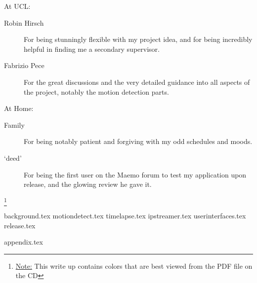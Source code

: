 \documentclass[11pt]{article} %
\begin{document}
	\begin{description}
	\item At UCL:
		\begin{description}
		\item [Robin Hirsch] For being stunningly flexible with my project idea, and for being incredibly helpful in finding me a secondary supervisor.
		\item [Fabrizio Pece] For the great discussions and the very detailed guidance into all aspects of the project, notably the motion detection parts.
		\end{description}
	\item At Home:
		\begin{description}
		\item [Family] For being notably patient and forgiving with my odd schedules and moods.
		\item [‘deed’] For being the first user on the Maemo forum to test my application upon release, and the glowing review he gave it.
		\end{description}		
	\end{description}
\footnote{\underline{Note:} This write up contains colors that are best viewed from the PDF file on the CD}
\pagebreak

{background.tex}
{motiondetect.tex}
{timelapse.tex}
{ipstreamer.tex}
{userinterfaces.tex}
{release.tex}

{appendix.tex}
\end{document}
